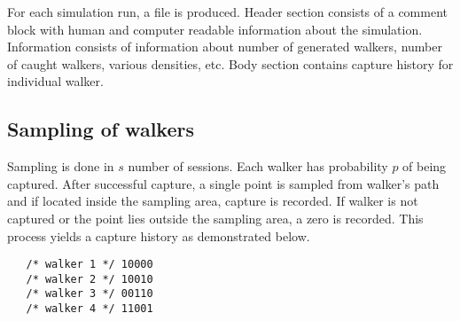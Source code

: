 \documentclass[a4paper]{article}
\begin{document}
For each simulation run, a file is produced. Header section consists of a comment block with human and computer readable information about the simulation. Information consists of information about number of generated walkers, number of caught walkers, various densities, etc. Body section contains capture history for individual walker.
   
   \subsection{Sampling of walkers}
Sampling is done in $s$ number of sessions. Each walker has probability $p$ of being captured. After successful capture, a single point is sampled from walker's path and if located inside the sampling area, capture is recorded. If walker is not captured or the point lies outside the sampling area, a zero is recorded. This process yields a capture history as demonstrated below.
   \begin{center}
   \begin{BVerbatim}
   /* walker 1 */ 10000
   /* walker 2 */ 10010
   /* walker 3 */ 00110
   /* walker 4 */ 11001
   \end{BVerbatim}
   \end{center}
   
\end{document}
